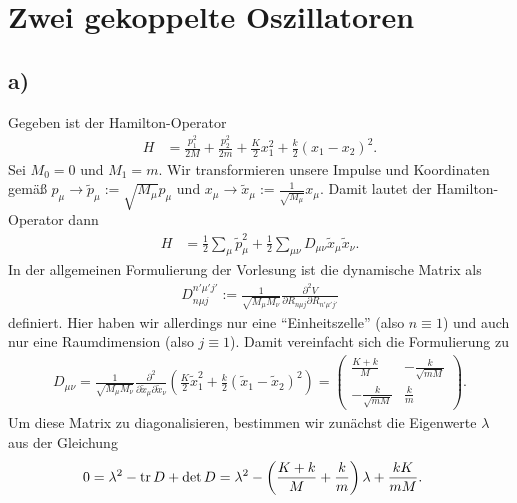 \documentclass[english, parskip=full]{scrartcl}
\title{\titel}
\author{\autor}
\date{\today}
\newcommand{\kla}{}
\newcommand{\tecxt}{}
\begin{document}
\maketitle  %

\section{Zwei gekoppelte Oszillatoren}
\subsection*{a)}
Gegeben ist der Hamilton-Operator
\begin{align}
H &= \frac{p_1^2}{2M} + \frac{p_2^2}{2m} + \frac{K}{2}x_1^2 + \frac{k}{2} \kla\left( x_1 - x_2 \right)^2.
\end{align}
Sei $M_0 = 0$ und $M_1 = m$.
Wir transformieren unsere Impulse und Koordinaten gemäß $p_\mu \rightarrow \tilde{p}_\mu := \sqrt{M_\mu}p_\mu$ und $x_\mu \rightarrow \tilde{x}_\mu := \frac{1}{\sqrt{M_\mu} } x_\mu$.
Damit lautet der Hamilton-Operator dann
\begin{align}
H &= \frac{1}{2}\sum_{\mu} \tilde{p}_\mu^2 + \frac{1}{2}\sum_{\mu\nu} D_{\mu\nu} \tilde{x}_\mu \tilde{x}_\nu.
\end{align}
In der allgemeinen Formulierung der Vorlesung ist die dynamische Matrix als
\begin{align}
D_{n\mu j}^{n'\mu'j'} := \frac{1}{\sqrt{M_\mu M_\nu}} \frac{\partial^2V}{\partial R_{n\mu j} \partial R_{n'\mu' j'}}
\end{align}
definiert.
Hier haben wir allerdings nur eine ``Einheitszelle'' (also $n\equiv 1$) und auch nur eine Raumdimension (also $j\equiv 1$).
Damit vereinfacht sich die Formulierung zu
\begin{align}
D_{\mu\nu} = \frac{1}{\sqrt{M_\mu M_\nu}} \frac{\partial^2}{\partial \tilde{x}_\mu \partial \tilde{x}_\nu} \kla\left( \frac{K}{2} \tilde{x}_1^2 + \frac{k}{2}(\tilde{x}_1 - \tilde{x}_2)^2 \right) = \begin{pmatrix}
\frac{K+k}{M} & - \frac{k}{\sqrt{mM}} \\ - \frac{k}{\sqrt{mM}} & \frac{k}{m}
\end{pmatrix}.
\end{align}
Um diese Matrix zu diagonalisieren, bestimmen wir zunächst die Eigenwerte $\lambda$ aus der Gleichung
\begin{align}
0 &= \lambda^2 - \tecxt\text{tr\,}D + \det D = \lambda^2 - \kla\left( \frac{K+k}{M} + \frac{k}{m} \right) \lambda + \frac{kK}{mM}.
\end{align}
\end{document}
